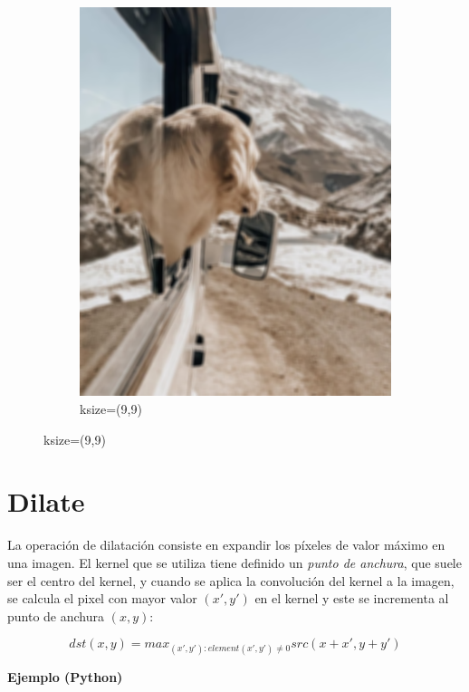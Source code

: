 \documentclass[a4paper, 12pt]{article}
\begin{document}
\begin{figure}[!ht]
\begin{subfigure}{0.4\textwidth}
        \includegraphics[width=\textwidth]{img/dog-blur.png}
        \caption{ksize=(9,9)}
    \end{subfigure}
\end{figure}

\section{Dilate}
La operación de dilatación consiste en expandir los píxeles de valor máximo en una imagen. El kernel que se utiliza tiene definido un \emph{punto de anchura}, que suele ser el centro del kernel, y cuando se aplica la convolución del kernel a la imagen, se calcula el pixel con mayor valor $(x',y')$ en el kernel y este se incrementa al punto de anchura $(x,y)$:

\begin{equation}
    dst(x,y)=max_{(x',y'):element(x',y')\neq 0}src(x+x',y+y')
\end{equation}

\textbf{Ejemplo (Python)}
\end{document}
